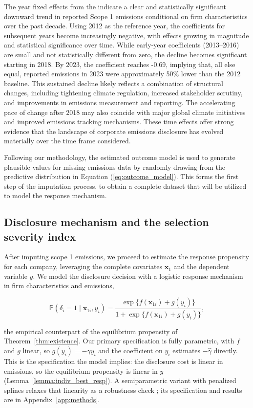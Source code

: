 \documentclass[a4paper,12pt]{article}
\newcommand{\citep}[1]{\parencite{#1}}
\begin{document}
The year fixed effects from the indicate a clear and statistically significant downward trend in reported Scope 1 emissions conditional on firm characteristics over the past decade. Using 2012 as the reference year, the coefficients for subsequent years become increasingly negative, with effects growing in magnitude and statistical significance over time. While early-year coefficients (2013–2016) are small and not statistically different from zero, the decline becomes significant starting in 2018. By 2023, the coefficient reaches -0.69, implying that, all else equal, reported emissions in 2023 were approximately 50\% lower than the 2012 baseline. This sustained decline likely reflects a combination of structural changes, including tightening climate regulation, increased stakeholder scrutiny, and improvements in emissions measurement and reporting. The accelerating pace of change after 2018 may also coincide with major global climate initiatives and improved emissions tracking mechanisms. These time effects offer strong evidence that the landscape of corporate emissions disclosure has evolved materially over the time frame considered.

Following our methodology, the estimated outcome model is used to generate plausible values for missing emissions data by randomly drawing from the predictive distribution in Equation (\ref{eq:outcome_model}). This forms the first step of the imputation process, to obtain a complete dataset that will be utilized to model the response mechanism. 

\subsection{Disclosure mechanism and the selection severity index}
\label{subsec:disc_mech}

After imputing scope 1 emissions, we proceed to estimate the response propensity for each company, leveraging the complete covariates $\textbf{x}_1$ and the dependent variable $y$. We model the disclosure decision with a logistic response mechanism in firm characteristics and emissions,

\begin{equation}
\label{eq:response_model}
\mathbb{P}(\delta_i = 1 \mid \mathbf{x}_{1i}, y_i)
= \frac{\exp\{ f(\mathbf{x}_{1i}) + g(y_i) \}}{1 + \exp\{ f(\mathbf{x}_{1i}) + g(y_i) \}},
\end{equation}

the empirical counterpart of the equilibrium propensity of Theorem~\ref{thm:existence}. Our primary specification is fully parametric, with $f$ and $g$ linear, so $g(y_i) = -\gamma y_i$ and the coefficient on $y_i$ estimates $-\hat\gamma$ directly. This is the specification the model implies: the disclosure cost is linear in emissions, so the equilibrium propensity is linear in $y$ (Lemma~\ref{lemma:indiv_best_resp}). A semiparametric variant with penalized splines relaxes that linearity as a robustness check \citep{yang2017semiparametric}; its specification and results are in Appendix~\ref{app:methods}.
\end{document}
